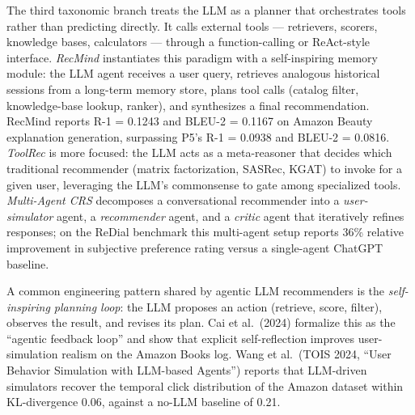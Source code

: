 \documentclass{article}
\begin{document}
The third taxonomic branch treats the LLM as a planner that orchestrates tools rather than predicting directly. It calls external tools --- retrievers, scorers, knowledge bases, calculators --- through a function-calling or ReAct-style interface. \emph{RecMind} \citep{wang2024recmindlargelangua} instantiates this paradigm with a self-inspiring memory module: the LLM agent receives a user query, retrieves analogous historical sessions from a long-term memory store, plans tool calls (catalog filter, knowledge-base lookup, ranker), and synthesizes a final recommendation. RecMind reports R-1 = 0.1243 and BLEU-2 = 0.1167 on Amazon Beauty explanation generation, surpassing P5's R-1 = 0.0938 and BLEU-2 = 0.0816. \emph{ToolRec} \citep{zhao2024recommendersystems} is more focused: the LLM acts as a meta-reasoner that decides which traditional recommender (matrix factorization, SASRec, KGAT) to invoke for a given user, leveraging the LLM's commonsense to gate among specialized tools. \emph{Multi-Agent CRS} \citep{fang2024amultiagentconvers} decomposes a conversational recommender into a \emph{user-simulator} agent, a \emph{recommender} agent, and a \emph{critic} agent that iteratively refines responses; on the ReDial benchmark this multi-agent setup reports 36\% relative improvement in subjective preference rating versus a single-agent ChatGPT baseline.

A common engineering pattern shared by agentic LLM recommenders is the \emph{self-inspiring planning loop}: the LLM proposes an action (retrieve, score, filter), observes the result, and revises its plan. Cai et al.~(2024) formalize this as the ``agentic feedback loop'' and show that explicit self-reflection improves user-simulation realism on the Amazon Books log. Wang et al.~(TOIS 2024, ``User Behavior Simulation with LLM-based Agents'') reports that LLM-driven simulators recover the temporal click distribution of the Amazon dataset within KL-divergence 0.06, against a no-LLM baseline of 0.21.
\end{document}
